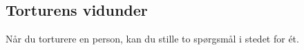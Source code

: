 \subsection*{Torturens vidunder}
Når du torturere en person, kan du stille to spørgsmål i stedet for ét.\\